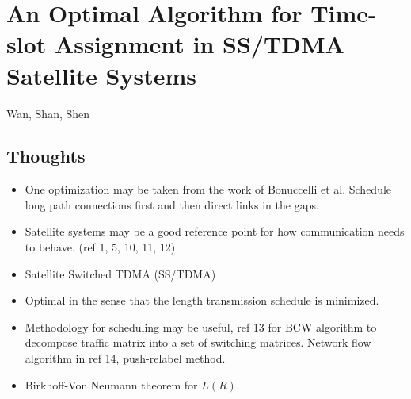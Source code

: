 \documentclass{article}
\begin{document}
\section{An Optimal Algorithm for Time-slot Assignment in SS/TDMA Satellite Systems}
Wan, Shan, Shen

\subsection{Thoughts}
\begin{itemize}
    \item One optimization may be taken from the work of Bonuccelli et al.  Schedule long path connections first and then direct links in the gaps.
    \item Satellite systems may be a good reference point for how communication needs to behave.  (ref 1, 5, 10, 11, 12)
    \item Satellite Switched TDMA (SS/TDMA)
    \item Optimal in the sense that the length transmission schedule is minimized.
    \item Methodology for scheduling may be useful, ref 13 for BCW algorithm to decompose traffic matrix into a set of switching matrices. Network flow algorithm in ref 14, push-relabel method.
    \item Birkhoff-Von Neumann theorem for $L(R)$.
\end{itemize}
\end{document}
